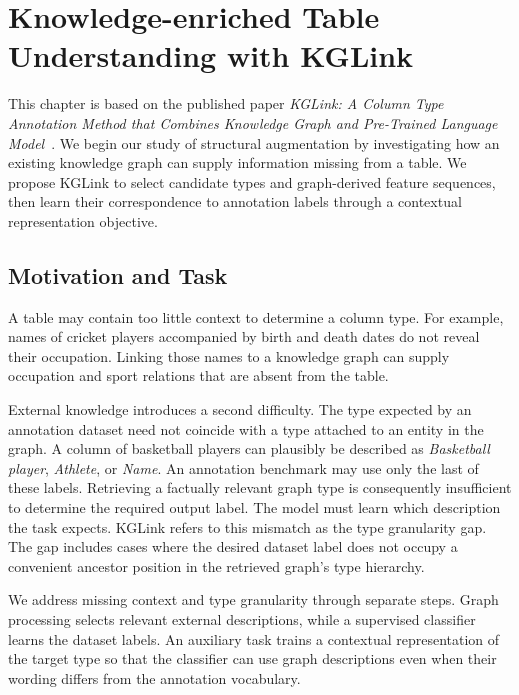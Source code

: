 \chapter{Knowledge-enriched Table Understanding with KGLink}
\label{ch:kglink}

This chapter is based on the published paper \emph{KGLink: A Column Type Annotation Method that Combines Knowledge Graph and Pre-Trained Language Model}~\cite{kglink-publication}. We begin our study of structural augmentation by investigating how an existing knowledge graph can supply information missing from a table. We propose KGLink to select candidate types and graph-derived feature sequences, then learn their correspondence to annotation labels through a contextual representation objective.

\section{Motivation and Task}
\label{sec:kglink:motivation}

A table may contain too little context to determine a column type. For example, names of cricket players accompanied by birth and death dates do not reveal their occupation. Linking those names to a knowledge graph can supply occupation and sport relations that are absent from the table.

External knowledge introduces a second difficulty. The type expected by an annotation dataset need not coincide with a type attached to an entity in the graph. A column of basketball players can plausibly be described as \emph{Basketball player}, \emph{Athlete}, or \emph{Name}. An annotation benchmark may use only the last of these labels. Retrieving a factually relevant graph type is consequently insufficient to determine the required output label. The model must learn which description the task expects. KGLink refers to this mismatch as the type granularity gap. The gap includes cases where the desired dataset label does not occupy a convenient ancestor position in the retrieved graph's type hierarchy.

We address missing context and type granularity through separate steps. Graph processing selects relevant external descriptions, while a supervised classifier learns the dataset labels. An auxiliary task trains a contextual representation of the target type so that the classifier can use graph descriptions even when their wording differs from the annotation vocabulary.

